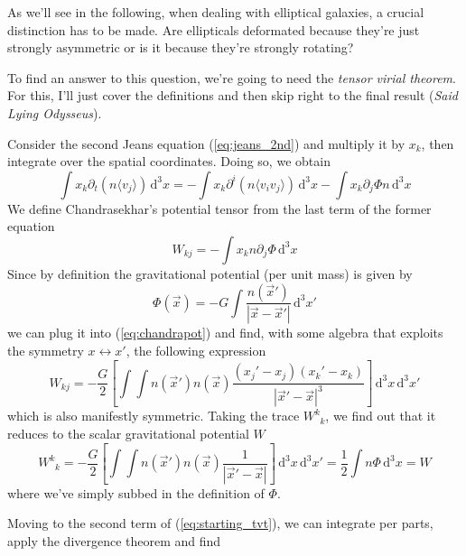 As we'll see in the following, when dealing with elliptical galaxies, a crucial distinction has to be made. Are ellipticals deformated because they're just strongly asymmetric or is it because they're strongly rotating?
\par To find an answer to this question, we're going to need the \emph{tensor virial theorem}. For this, I'll just cover the definitions and then skip right to the final result (\emph{Said Lying Odysseus}).
\par Consider the second Jeans equation (\ref{eq:jeans_2nd}) and multiply it by $x_{k}$, then integrate over the spatial coordinates. Doing so, we obtain 
\begin{equation}
    \int x_{k}\partial_{t}(n\langle v_{j}\rangle)\,\text{d}^{3}x = -\int x_{k}\partial^{i}(n\langle v_{i}v_{j}\rangle)\,\text{d}^{3}x - \int x_{k}\partial_{j}\Phi n\,\text{d}^{3}x
    \label{eq:starting_tvt}
\end{equation}
We define Chandrasekhar's potential tensor from the last term of the former equation 
\begin{equation}
    W_{kj} = -\int x_{k}n\partial_{j}\Phi\,\text{d}^{3}x
    \label{eq:chandrapot}
\end{equation}
Since by definition the gravitational potential (per unit mass) is given by 
\begin{equation*}
    \Phi(\vec{x}) = -G\int \frac{n(\vec{x}')}{|\vec{x}-\vec{x}'|}\,\text{d}^{3}x'
\end{equation*}
we can plug it into (\ref{eq:chandrapot}) and find, with some algebra that exploits the symmetry $x\longleftrightarrow x'$, the following expression 
\begin{equation*}
    W_{kj} = -\frac{G}{2}\left[\int\int n(\vec{x}')n(\vec{x})\frac{(x_{j}'-x_{j})(x_{k}'-x_{k})}{|\vec{x}'-\vec{x}|^{3}}\right]\,\text{d}^{3}x\,\text{d}^{3}x'
\end{equation*} 
which is also manifestly symmetric. Taking the trace $W^{k}_{\;\;k}$, we find out that it reduces to the scalar gravitational potential $W$
\begin{equation*}
    W^{k}_{\;\;k} = -\frac{G}{2}\left[\int\int n(\vec{x}')n(\vec{x})\frac{1}{|\vec{x}'-\vec{x}|}\right]\,\text{d}^{3}x\,\text{d}^{3}x' = \frac{1}{2}\int n\Phi\,\text{d}^{3}x = W
\end{equation*}
where we've simply subbed in the definition of $\Phi$.
\par Moving to the second term of (\ref{eq:starting_tvt}), we can integrate per parts, apply the divergence theorem and find 
